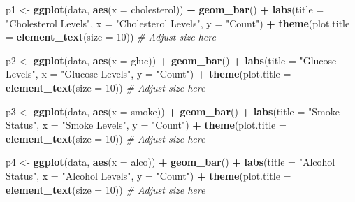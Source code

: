 \documentclass[
]{article}
\newenvironment{Shaded}{\begin{snugshade}}{\end{snugshade}}
\newcommand{\AttributeTok}[1]{\textcolor[rgb]{0.13,0.29,0.53}{#1}}
\newcommand{\CommentTok}[1]{\textcolor[rgb]{0.56,0.35,0.01}{\textit{#1}}}
\newcommand{\DecValTok}[1]{\textcolor[rgb]{0.00,0.00,0.81}{#1}}
\newcommand{\FunctionTok}[1]{\textcolor[rgb]{0.13,0.29,0.53}{\textbf{#1}}}
\newcommand{\NormalTok}[1]{#1}
\newcommand{\OtherTok}[1]{\textcolor[rgb]{0.56,0.35,0.01}{#1}}
\newcommand{\SpecialCharTok}[1]{\textcolor[rgb]{0.81,0.36,0.00}{\textbf{#1}}}
\newcommand{\StringTok}[1]{\textcolor[rgb]{0.31,0.60,0.02}{#1}}
\begin{document}
\begin{Shaded}
\begin{Highlighting}[]
\NormalTok{p1 }\OtherTok{\textless{}{-}} \FunctionTok{ggplot}\NormalTok{(data, }\FunctionTok{aes}\NormalTok{(}\AttributeTok{x =}\NormalTok{ cholesterol)) }\SpecialCharTok{+}
  \FunctionTok{geom\_bar}\NormalTok{() }\SpecialCharTok{+}
  \FunctionTok{labs}\NormalTok{(}\AttributeTok{title =} \StringTok{"Cholesterol Levels"}\NormalTok{,}
       \AttributeTok{x =} \StringTok{"Cholesterol Levels"}\NormalTok{,}
       \AttributeTok{y =} \StringTok{"Count"}\NormalTok{) }\SpecialCharTok{+}
  \FunctionTok{theme}\NormalTok{(}\AttributeTok{plot.title =} \FunctionTok{element\_text}\NormalTok{(}\AttributeTok{size =} \DecValTok{10}\NormalTok{)) }\CommentTok{\# Adjust size here}

\NormalTok{p2 }\OtherTok{\textless{}{-}} \FunctionTok{ggplot}\NormalTok{(data, }\FunctionTok{aes}\NormalTok{(}\AttributeTok{x =}\NormalTok{ gluc)) }\SpecialCharTok{+}
  \FunctionTok{geom\_bar}\NormalTok{() }\SpecialCharTok{+}
  \FunctionTok{labs}\NormalTok{(}\AttributeTok{title =} \StringTok{"Glucose Levels"}\NormalTok{,}
       \AttributeTok{x =} \StringTok{"Glucose Levels"}\NormalTok{,}
       \AttributeTok{y =} \StringTok{"Count"}\NormalTok{) }\SpecialCharTok{+}
  \FunctionTok{theme}\NormalTok{(}\AttributeTok{plot.title =} \FunctionTok{element\_text}\NormalTok{(}\AttributeTok{size =} \DecValTok{10}\NormalTok{)) }\CommentTok{\# Adjust size here}

\NormalTok{p3 }\OtherTok{\textless{}{-}} \FunctionTok{ggplot}\NormalTok{(data, }\FunctionTok{aes}\NormalTok{(}\AttributeTok{x =}\NormalTok{ smoke)) }\SpecialCharTok{+}
  \FunctionTok{geom\_bar}\NormalTok{() }\SpecialCharTok{+}
  \FunctionTok{labs}\NormalTok{(}\AttributeTok{title =} \StringTok{"Smoke Status"}\NormalTok{,}
       \AttributeTok{x =} \StringTok{"Smoke Levels"}\NormalTok{,}
       \AttributeTok{y =} \StringTok{"Count"}\NormalTok{) }\SpecialCharTok{+}
  \FunctionTok{theme}\NormalTok{(}\AttributeTok{plot.title =} \FunctionTok{element\_text}\NormalTok{(}\AttributeTok{size =} \DecValTok{10}\NormalTok{)) }\CommentTok{\# Adjust size here}

\NormalTok{p4 }\OtherTok{\textless{}{-}} \FunctionTok{ggplot}\NormalTok{(data, }\FunctionTok{aes}\NormalTok{(}\AttributeTok{x =}\NormalTok{ alco)) }\SpecialCharTok{+}
  \FunctionTok{geom\_bar}\NormalTok{() }\SpecialCharTok{+}
  \FunctionTok{labs}\NormalTok{(}\AttributeTok{title =} \StringTok{"Alcohol Status"}\NormalTok{,}
       \AttributeTok{x =} \StringTok{"Alcohol Levels"}\NormalTok{,}
       \AttributeTok{y =} \StringTok{"Count"}\NormalTok{) }\SpecialCharTok{+}
  \FunctionTok{theme}\NormalTok{(}\AttributeTok{plot.title =} \FunctionTok{element\_text}\NormalTok{(}\AttributeTok{size =} \DecValTok{10}\NormalTok{)) }\CommentTok{\# Adjust size here}


\end{Highlighting}
\end{Shaded}
\end{document}
